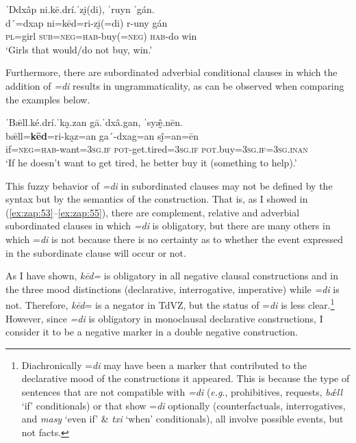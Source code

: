 \documentclass[output=paper,colorlinks=true, citecolor=brown]{langscibook}
\begin{document}
\ea\label{ex:zap:60} 
    \glll ˈDdxâp ni.kē.drí.ˈzḭ(di), ˈruyn ˈgán.\\ 
          d´=dxap ni=kēd=ri-zḭ(=di) r-uny gán\\
          \textsc{pl}=girl \textsc{sub}=\textsc{neg}=\textsc{hab}{}-buy(=\textsc{neg}) \textsc{hab}{}-do win\\
    \glt ‘Girls that would/do not buy, win.’
\z 

Furthermore, there are subordinated adverbial conditional clauses in which the addition of \textit{=di} results in ungrammaticality, as can be observed when comparing the examples below.

\ea\label{ex:zap:61} 
    \glll ˈBǣll.ké.drí.ˈka̰.zan gā.ˈdxâ.gan, ˈsyæ̰̂.nēn.\\ 
          bǣll=\textbf{kēd}=ri-ka̰z=an ga´-dxag=an sḭ̂=an=ēn\\
          if=\textsc{neg}=\textsc{hab}{}-want=\textsc{3sg.if} \textsc{pot}{}-get.tired=\textsc{3sg.if} \textsc{pot}.buy=\textsc{3sg.if}=\textsc{3sg.inan}\\
    \glt ‘If he doesn’t want to get tired, he better buy it (something to help).’
\z 

\z 

This fuzzy behavior of \textit{=di} in subordinated clauses may not be defined by the syntax but by the semantics of the construction. That is, as I showed in (\ref{ex:zap:53}--\ref{ex:zap:55}), there are complement, relative and adverbial subordinated clauses in which \textit{=di} is obligatory, but there are many others in which =\textit{di} is not because there is no certainty as to whether the event expressed in the subordinate clause will occur or not. 

As I have shown, \textit{kēd=} is obligatory in all negative clausal constructions and in the three mood distinctions (declarative, interrogative, imperative) while \textit{=di} is not. Therefore, \textit{kēd}= is a negator in TdVZ, but the status of =\textit{di} is less clear.\footnote{Diachronically =\textit{di} may have been a marker that contributed to the declarative mood of the constructions it appeared. This is because the type of sentences that are not compatible with \textit{=di} (\textit{e.g}., prohibitives, requests, \textit{bǽll} ‘if’ conditionals) or that show =\textit{di} optionally (counterfactuals, interrogatives, and \textit{masy} ‘even if’ \& \textit{txi} ‘when’ conditionals), all involve possible events, but not facts.} However, since \textit{=di} is obligatory in monoclausal declarative constructions, I consider it to be a negative marker in a double negative construction. 
\end{document}
